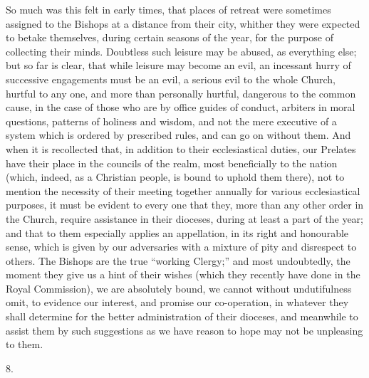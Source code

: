 So much was this felt in early times, that places
of retreat were sometimes assigned to the Bishops at a distance from
their city, whither they were expected to betake themselves, during
certain seasons of the year, for the purpose of collecting their
minds. Doubtless such leisure may be abused, as everything else; but
so far is clear, that while leisure may become an evil, an incessant
hurry of successive engagements must be an evil, a serious evil to the
whole Church, hurtful to any one, and more than personally hurtful,
dangerous to the common cause, in the case of those who are by office
guides of conduct, arbiters in moral questions, patterns of holiness
and wisdom, and not the mere executive of a system which is ordered by
prescribed rules, and can go on without them. And when it is
recollected that, in addition to their ecclesiastical duties, our
Prelates have their place in the councils of the realm, most
beneficially to the nation (which, indeed, as a Christian people,
is bound to uphold them there), not to mention the necessity of their
meeting together annually for various ecclesiastical purposes, it must
be evident to every one that they, more than any other order in the
Church, require assistance in their dioceses, during at least a part
of the year; and that to them especially applies an appellation, in
its right and honourable sense, which is given by our adversaries with
a mixture of pity and disrespect to others. The Bishops are the true ``working
Clergy;'' and most undoubtedly, the moment they give us a hint of their
wishes (which they recently have done in the Royal Commission), we are
absolutely bound, we cannot without undutifulness omit, to evidence
our interest, and promise our co-operation, in whatever they shall
determine for the better administration of their dioceses, and
meanwhile to assist them by such suggestions as we have reason to hope
may not be unpleasing to them.

8.

